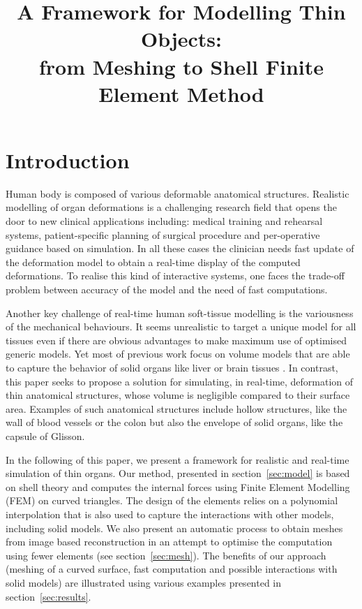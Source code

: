 \documentclass{llncs}
\newcommand{\CD}[1]{{\color{magenta}{\textbf{CD: #1}}}}
\begin{document}
\title{A Framework for Modelling Thin Objects: \\ from Meshing to Shell Finite Element Method}

\maketitle

\begin{abstract}

\end{abstract}

\section{Introduction}

Human body is composed of various deformable anatomical structures. Realistic modelling of organ deformations is a challenging research field that opens the door to new clinical applications including: medical training and rehearsal systems, patient-specific planning of surgical procedure and per-operative guidance based on simulation. In all these cases the clinician needs fast update of the deformation model to obtain a real-time display of the computed deformations. To realise this kind of interactive systems, one faces the trade-off problem between accuracy of the model and the need of fast computations. 

Another key challenge of real-time human soft-tissue modelling is the variousness of the mechanical behaviours. It seems unrealistic to target a unique model for all tissues even if there are obvious advantages to make maximum use of optimised generic models. Yet most of previous work focus on volume models that are able to capture the behavior of solid organs like liver \cite{} or brain tissues \cite{} \CD{TODO: biblio}. In contrast, this paper seeks to propose a solution for simulating, in real-time, deformation of thin anatomical structures, whose volume is negligible compared to their surface area. Examples of such anatomical structures include hollow structures, like the wall of blood vessels or the colon but also the envelope of solid organs, like the capsule of Glisson.

In the following of this paper, we present a framework for realistic and real-time simulation of thin organs. Our method, presented in section~\ref{sec:model} is based on shell theory and computes the internal forces using Finite Element Modelling (FEM) on curved triangles. The design of the elements relies on a polynomial interpolation that is also used to capture the interactions with other models, including solid models. We also present an automatic process to obtain meshes from image based reconstruction in an attempt to optimise the computation using fewer elements (see section~\ref{sec:mesh}). The benefits of our approach (meshing of a curved surface, fast computation and possible interactions with solid models) are illustrated using various examples presented in section~\ref{sec:results}.
\end{document}
